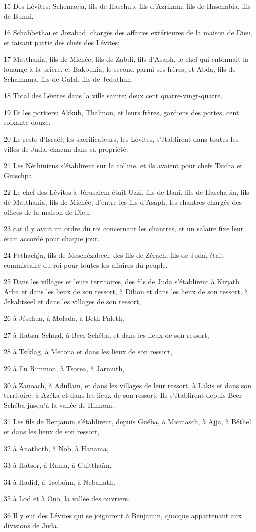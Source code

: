 \par 15 Des Lévites: Schemaeja, fils de Haschub, fils d'Azrikam, fils de Haschabia, fils de Bunni,
\par 16 Schabbethaï et Jozabad, chargés des affaires extérieures de la maison de Dieu, et faisant partie des chefs des Lévites;
\par 17 Matthania, fils de Michée, fils de Zabdi, fils d'Asaph, le chef qui entonnait la louange à la prière, et Bakbukia, le second parmi ses frères, et Abda, fils de Schammua, fils de Galal, fils de Jeduthun.
\par 18 Total des Lévites dans la ville sainte: deux cent quatre-vingt-quatre.
\par 19 Et les portiers: Akkub, Thalmon, et leurs frères, gardiens des portes, cent soixante-douze.
\par 20 Le reste d'Israël, les sacrificateurs, les Lévites, s'établirent dans toutes les villes de Juda, chacun dans sa propriété.
\par 21 Les Néthiniens s'établirent sur la colline, et ils avaient pour chefs Tsicha et Guischpa.
\par 22 Le chef des Lévites à Jérusalem était Uzzi, fils de Bani, fils de Haschabia, fils de Matthania, fils de Michée, d'entre les fils d'Asaph, les chantres chargés des offices de la maison de Dieu;
\par 23 car il y avait un ordre du roi concernant les chantres, et un salaire fixe leur était accordé pour chaque jour.
\par 24 Pethachja, fils de Meschézabeel, des fils de Zérach, fils de Juda, était commissaire du roi pour toutes les affaires du peuple.
\par 25 Dans les villages et leurs territoires, des fils de Juda s'établirent à Kirjath Arba et dans les lieux de son ressort, à Dibon et dans les lieux de son ressort, à Jekabtseel et dans les villages de son ressort,
\par 26 à Jéschua, à Molada, à Beth Paleth,
\par 27 à Hatsar Schual, à Beer Schéba, et dans les lieux de son ressort,
\par 28 à Tsiklag, à Mecona et dans les lieux de son ressort,
\par 29 à En Rimmon, à Tsorea, à Jarmuth,
\par 30 à Zanoach, à Adullam, et dans les villages de leur ressort, à Lakis et dans son territoire, à Azéka et dans les lieux de son ressort. Ils s'établirent depuis Beer Schéba jusqu'à la vallée de Hinnom.
\par 31 Les fils de Benjamin s'établirent, depuis Guéba, à Micmasch, à Ajja, à Béthel et dans les lieux de son ressort,
\par 32 à Anathoth, à Nob, à Hanania,
\par 33 à Hatsor, à Rama, à Guitthaïm,
\par 34 à Hadid, à Tseboïm, à Neballath,
\par 35 à Lod et à Ono, la vallée des ouvriers.
\par 36 Il y eut des Lévites qui se joignirent à Benjamin, quoique appartenant aux divisions de Juda.

